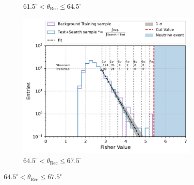 \begin{figure}[h!]
\begin{subfigure}[r]{.48\textwidth}
     \caption{$ 61.5^{\circ} <\theta_{\text{Rec}} \leq 64.5^{\circ}$}
    \end{subfigure}
    \hfill
    \begin{subfigure}[l]{.48\textwidth}
      \centering
      \includegraphics[width=\linewidth]{thesis_figures/Nu_analysis/Fisher_plots/Fisher_fit_search+test_bkg_region_64.5_67.5.pdf}
      \caption{$ 64.5^{\circ} <\theta_{\text{Rec}} \leq 67.5^{\circ}$}
    \end{subfigure}


\end{figure}
